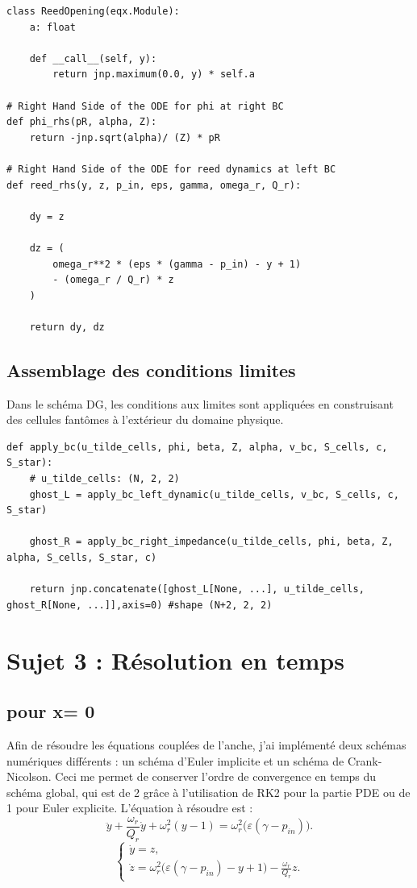 \documentclass[12pt,a4paper]{article}
\begin{document}
\begin{verbatim}
class ReedOpening(eqx.Module):
    a: float

    def __call__(self, y):
        return jnp.maximum(0.0, y) * self.a

# Right Hand Side of the ODE for phi at right BC
def phi_rhs(pR, alpha, Z):
    return -jnp.sqrt(alpha)/ (Z) * pR

# Right Hand Side of the ODE for reed dynamics at left BC
def reed_rhs(y, z, p_in, eps, gamma, omega_r, Q_r):
    
    dy = z
    
    dz = (
        omega_r**2 * (eps * (gamma - p_in) - y + 1)
        - (omega_r / Q_r) * z
    )
    
    return dy, dz
\end{verbatim}

\subsection{Assemblage des conditions limites}
Dans le schéma DG, les conditions aux limites sont appliquées en construisant des cellules fantômes à l'extérieur du domaine physique.

\begin{verbatim}
def apply_bc(u_tilde_cells, phi, beta, Z, alpha, v_bc, S_cells, c, S_star):
    # u_tilde_cells: (N, 2, 2)
    ghost_L = apply_bc_left_dynamic(u_tilde_cells, v_bc, S_cells, c, S_star)

    ghost_R = apply_bc_right_impedance(u_tilde_cells, phi, beta, Z, alpha, S_cells, S_star, c)

    return jnp.concatenate([ghost_L[None, ...], u_tilde_cells, ghost_R[None, ...]],axis=0) #shape (N+2, 2, 2)
\end{verbatim}

\section{Sujet 3 : Résolution en temps }

\subsection{pour x= 0}
Afin de résoudre les équations couplées de l'anche, j'ai implémenté deux schémas numériques différents : un schéma d'Euler implicite et un schéma de Crank-Nicolson.
Ceci me permet de conserver l'ordre de convergence en temps du schéma global, qui est de 2 grâce à l'utilisation de RK2 pour la partie PDE ou de 1 pour Euler explicite.
L'équation à résoudre est :
\begin{equation}
    \ddot{y} + \frac{\omega_r}{Q_r} \dot{y} + \omega_r^2 (y-1) = \omega_r^2 \bigl( \varepsilon(\gamma - p_{in}) \bigr).
\end{equation}
\begin{equation}
\begin{cases}
\dot{y} = z,
\\[0.4em]
\dot{z} = \omega_r^2 \bigl( \varepsilon(\gamma - p_{in}) - y + 1 \bigr) - \frac{\omega_r}{Q_r} z.
\end{cases}
\end{equation}
\end{document}
